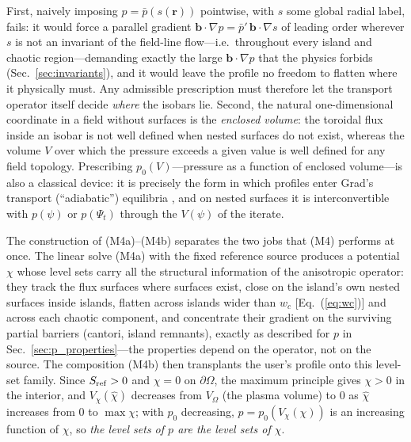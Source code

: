 \documentclass[english]{article}
\newcommand{\bb}{\mathbf{b}}
\newcommand{\br}{\mathbf{r}}
\begin{document}
First, naively imposing $p=\bar p(s(\br))$ pointwise, with $s$ some global radial label, fails: it
would force a parallel gradient $\bb\cdot\nabla p=\bar p'\,\bb\cdot\nabla s$ of leading order
wherever $s$ is not an invariant of the field-line flow---i.e.\ throughout every island and chaotic
region---demanding exactly the large $\bb\cdot\nabla p$ that the physics forbids
(Sec.~\ref{sec:invariants}), and it would leave the profile no freedom to flatten where it
physically must. Any admissible prescription must therefore let the transport operator itself
decide \emph{where} the isobars lie. Second, the natural one-dimensional coordinate in a field
without surfaces is the \emph{enclosed volume}: the toroidal flux inside an isobar is not well
defined when nested surfaces do not exist, whereas the volume $V$ over which the pressure exceeds a
given value is well defined for any field topology. Prescribing $p_0(V)$---pressure as a function
of enclosed volume---is also a classical device: it is precisely the form in which profiles enter
Grad's transport (``adiabatic'') equilibria \cite{grad1975}, and on nested surfaces it is
interconvertible with $p(\psi)$ or $p(\Psi_t)$ through the $V(\psi)$ of the iterate.

The construction of (M4a)--(M4b) separates the two jobs that (M4) performs at once. The linear
solve (M4a) with the fixed reference source produces a potential $\chi$ whose level sets carry all
the structural information of the anisotropic operator: they track the flux surfaces where surfaces
exist, close on the island's own nested surfaces inside islands, flatten across islands wider than
$w_c$ [Eq.~(\ref{eq:wc})] and across each chaotic component, and concentrate their gradient on the
surviving partial barriers (cantori, island remnants), exactly as described for $p$ in
Sec.~\ref{sec:p_properties}---the properties depend on the operator, not on the source. The
composition (M4b) then transplants the user's profile onto this level-set family. Since $S_{\rm
ref}>0$ and $\chi=0$ on $\partial\Omega$, the maximum principle gives $\chi>0$ in the interior, and
$V_\chi(\hat\chi)$ decreases from $V_\Omega$ (the plasma volume) to $0$ as $\hat\chi$ increases
from $0$ to $\max\chi$; with $p_0$ decreasing, $p=p_0(V_\chi(\chi))$ is an increasing function of
$\chi$, so \emph{the level sets of $p$ are the level sets of $\chi$}.
\end{document}
